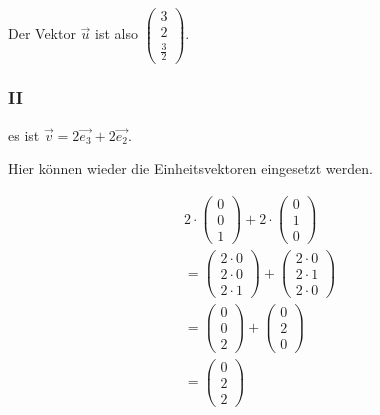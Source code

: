 Der Vektor $\vec{u}$ ist also $\begin{pmatrix}
        3 \\ 2 \\ \frac{3}{2}
    \end{pmatrix}$.

\subsubsection{II}
es ist $\vec{v} = 2\vec{e_3} + 2\vec{e_2}$.

Hier können wieder die Einheitsvektoren eingesetzt werden.

\begin{align*}
    2 \cdot \begin{pmatrix}
                0 \\ 0 \\ 1
            \end{pmatrix} + 2 \cdot \begin{pmatrix}
                                        0 \\ 1 \\ 0
                                    \end{pmatrix}       \\
    = \begin{pmatrix}
          2 \cdot 0 \\ 2 \cdot 0 \\ 2 \cdot 1
      \end{pmatrix} + \begin{pmatrix}
                          2 \cdot 0 \\ 2 \cdot 1 \\ 2 \cdot 0
                      \end{pmatrix} \\
    = \begin{pmatrix}
          0 \\ 0 \\ 2
      \end{pmatrix} + \begin{pmatrix}
                          0 \\ 2 \\ 0
                      \end{pmatrix}                     \\
    = \begin{pmatrix}
          0 \\ 2 \\ 2
      \end{pmatrix}
\end{align*}

